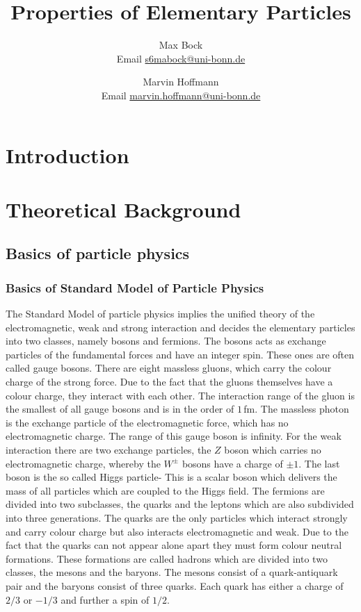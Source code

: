 \documentclass[10pt, a4paper, notitlepage, DIV=15]{scrartcl}
\title{Properties of Elementary Particles}
\author{Max Bock \\ Email \href{mailto:s6mabock@uni-bonn.de}{s6mabock@uni-bonn.de} 
	\and Marvin Hoffmann \\ Email \href{mailto:marvin.hoffmann@uni-bonn.de}{marvin.hoffmann@uni-bonn.de} }
\begin{document}
\maketitle
\tableofcontents
\newpage
\section{Introduction}

\section{Theoretical Background}
\subsection{Basics of particle physics}
\subsubsection{Basics of Standard Model of Particle Physics}
The Standard Model of particle physics implies the unified theory of the electromagnetic, weak and strong interaction and decides the elementary particles into two classes, namely bosons and fermions. \newline
The bosons acts as exchange particles of the fundamental forces and have an integer spin. These ones are often called gauge bosons. There are eight massless gluons, which carry the colour charge of the strong force. Due to the fact that the gluons themselves have a colour charge, they interact with each other. The interaction range of the gluon is the smallest of all gauge bosons and is in the order of $1\,$fm. The massless photon is the exchange particle of the electromagnetic force, which has no electromagnetic charge. The range of this gauge boson is infinity. For the weak interaction there are two exchange particles, the $Z$ boson which carries no electromagnetic charge, whereby the $W^{\pm}$ bosons have a charge of $\pm 1$. The last boson is the so called Higgs particle- This is a scalar boson which delivers the mass of all particles which are coupled to the Higgs field.  \newline
The fermions are divided into two subclasses, the quarks and the leptons which are also subdivided into three generations. The quarks are the only particles which interact strongly and carry colour charge but also interacts electromagnetic and weak. Due to the fact that the quarks can not appear alone apart they must form colour neutral formations. These formations are called hadrons which are divided into two classes, the mesons and the baryons. The mesons consist of a quark-antiquark pair and the baryons consist of three quarks. Each quark has either a charge of $2/3$ or $-1/3$ and further a spin of $1/2$. 
\end{document}

